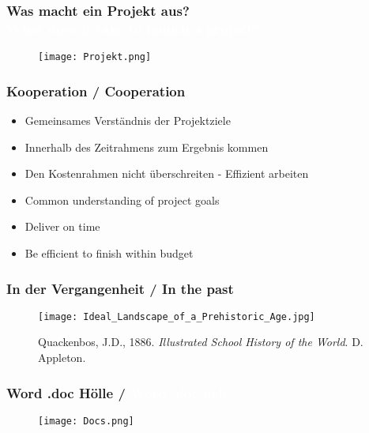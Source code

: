 \documentclass[13pt]{beamer}
\begin{document}
{
\begin{frame}
  \frametitle{Was macht ein Projekt aus? \\ \textcolor{white}{What does it take to launch a project?}}
  \begin{figure}
  \texttt{[image: Projekt.png]}
  \end{figure}
\end{frame}
}

\begin{frame}
  \frametitle{Kooperation / \textcolor{mfn_green}{Cooperation}}

  \begin{itemize}
  \item{Gemeinsames Verständnis der Projektziele}
  \item{Innerhalb des Zeitrahmens zum Ergebnis kommen}
  \item{Den Kostenrahmen nicht überschreiten - Effizient arbeiten}
  \end{itemize}
  
  \begin{itemize}
  \item{\textcolor{mfn_green}{Common understanding of project goals}}
  \item{\textcolor{mfn_green}{Deliver on time}}
  \item{\textcolor{mfn_green}{Be efficient to finish within budget}}
  \end{itemize}
\end{frame}

%
%

\begin{frame}
  \frametitle{In der Vergangenheit / \textcolor{mfn_green}{In the past}}
  \begin{figure}
    \texttt{[image: Ideal\_Landscape\_of\_a\_Prehistoric\_Age.jpg]}
    \caption{Quackenbos, J.D., 1886. \textit{Illustrated School History of the World}. D. Appleton.}
  \end{figure}
\end{frame}

{
\begin{frame}
  \frametitle{Word\textsuperscript{\tiny\textregistered} .doc Hölle /
    \textcolor{white}{Word\textsuperscript{\tiny\textregistered} .doc hell}}
  \begin{figure}
  \texttt{[image: Docs.png]}
  \end{figure}
\end{frame}
}
\end{document}

